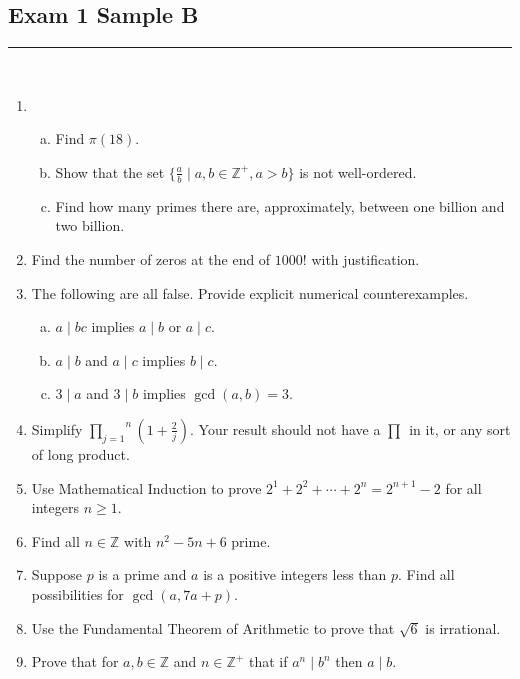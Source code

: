 \documentclass[class=article, crop=false]{standalone}
\def\integers{{\mathbb Z}}
\def\inlineprod#1#2{\overset{#2}{\underset{#1}{\prod}}}
\begin{document}
\subsection*{Exam 1 Sample B}
\rule{\textwidth}{1pt}\\
\begin{enumerate}[1.]
	\item 
	\begin{enumerate}[(a)]
		\item Find $\pi(18)$.
		
		\item Show that the set $\{\frac{a}{b} \mid a,b\in\integers^+, a>b\}$ is not well-ordered.
		
		\item Find how many primes there are, approximately, between one billion and two billion.
	
	\end{enumerate}
	
	\item Find the number of zeros at the end of $1000!$ with justification.
	
	\item The following are all false. Provide explicit numerical counterexamples.
	\begin{enumerate}[(a)]
		\item $a\mid bc$ implies $a\mid b$ or $a\mid c$.
		
		\item $a\mid b$ and $a\mid c$ implies $b\mid c$.
		
		\item $3\mid a$ and $3\mid b$ implies $\gcd(a,b)=3$.
	
	\end{enumerate}

	\item Simplify $\inlineprod{j=1}{n} \left(1+\frac{2}{j}\right)$. Your result should not have a 
	$\inlineprod{}{}$ in it, or any sort of long product.

	\item Use Mathematical Induction to prove $2^1+2^2+\cdots+2^n=2^{n+1}-2$ for all integers $n\geq 1$.
	
	\item Find all $n\in\integers$ with $n^2-5n+6$ prime.
	
	\item Suppose $p$ is a prime and $a$ is a positive integers less than $p$. Find all possibilities for
	$\gcd(a,7a+p)$.

	\item Use the Fundamental Theorem of Arithmetic to prove that $\sqrt{6}$ is irrational.
	
	\item Prove that for $a,b\in\integers$ and $n\in\integers^+$ that if $a^n\mid b^n$ then $a\mid b$.
	
\end{enumerate}
\end{document}
